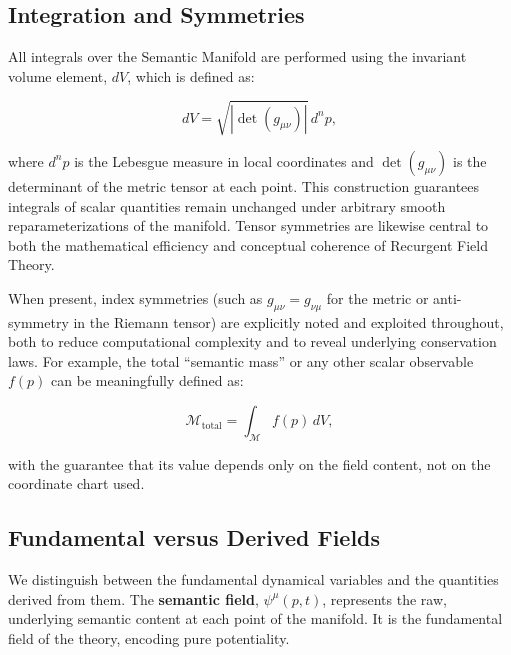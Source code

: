 
\subsection{Integration and Symmetries}
\label{2.4.5:integration_and_symmetries}

All integrals over the Semantic Manifold are performed using the invariant volume element, \(dV\), which is defined as:

\begin{equation}
dV = \sqrt{|\det(g_{\mu\nu})|} \, d^n p,
\end{equation}

where \(d^n p\) is the Lebesgue measure in local coordinates and \(\det(g_{\mu\nu})\) is the determinant of the metric tensor at each point. This construction guarantees integrals of scalar quantities remain unchanged under arbitrary smooth reparameterizations of the manifold. Tensor symmetries are likewise central to both the mathematical efficiency and conceptual coherence of Recurgent Field Theory.

When present, index symmetries (such as \(g_{\mu\nu} = g_{\nu\mu}\) for the metric or anti-symmetry in the Riemann tensor) are explicitly noted and exploited throughout, both to reduce computational complexity and to reveal underlying conservation laws. For example, the total “semantic mass” or any other scalar observable \(f(p)\) can be meaningfully defined as:

\begin{equation}
\mathcal{M}_{\text{total}} = \int_{\mathcal{M}} f(p) \, dV,
\end{equation}

with the guarantee that its value depends only on the field content, not on the coordinate chart used.



\subsection{Fundamental versus Derived Fields}
\label{2.4.6:fundamental_versus_derived_fields}

We distinguish between the fundamental dynamical variables and the quantities derived from them. The \textbf{semantic field}, \(\psi^\mu(p,t)\), represents the raw, underlying semantic content at each point of the manifold. It is the fundamental field of the theory, encoding pure potentiality.

